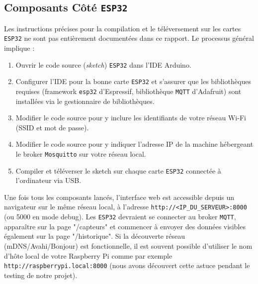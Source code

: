 \documentclass[12pt]{article}
\begin{document}
\subsection{Composants Côté \texttt{ESP32}}

Les instructions précises pour la compilation et le téléversement sur les cartes \texttt{ESP32} ne sont pas entièrement documentées dans ce rapport. Le processus général implique :
\begin{enumerate}
    \item Ouvrir le code source (\textit{sketch}) \texttt{ESP32} dans l'IDE Arduino.
    \item Configurer l'IDE pour la bonne carte \texttt{ESP32} et s'assurer que les bibliothèques requises (framework \texttt{esp32} d'Espressif, bibliothèque \texttt{MQTT} d'Adafruit) sont installées via le gestionnaire de bibliothèques.
    \item Modifier le code source pour y inclure les identifiants de votre réseau Wi-Fi (SSID et mot de passe).
    \item Modifier le code source pour y indiquer l'adresse IP de la machine hébergeant le broker \texttt{Mosquitto} sur votre réseau local.
    \item Compiler et téléverser le sketch sur chaque carte \texttt{ESP32} connectée à l'ordinateur via USB.
\end{enumerate} \hfill \break

Une fois tous les composants lancés, l'interface web est accessible depuis un navigateur sur le même réseau local, à l'adresse \texttt{http://<IP\_DU\_SERVEUR>:8000} (ou 5000 en mode debug). Les \texttt{ESP32} devraient se connecter au broker \texttt{MQTT}, apparaître sur la page "/capteurs" et commencer à envoyer des données visibles également sur la page "/historique". Si la découverte réseau (mDNS/Avahi/Bonjour) est fonctionnelle, il est souvent possible d'utiliser le nom d'hôte local de votre Raspberry Pi comme par exemple \texttt{http://raspberrypi.local:8000} (nous avons découvert cette astuce pendant le testing de notre projet).
\end{document}
